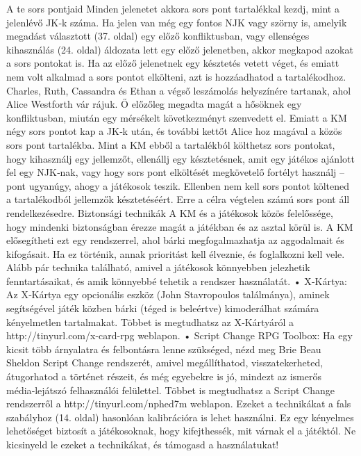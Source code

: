 \documentclass[oneside]{book}
\begin{document}
A te sors pontjaid
Minden jelenetet akkora sors pont tartalékkal kezdj, mint a jelenlévő JK‑k száma. Ha jelen van még egy fontos NJK vagy szörny is, amelyik megadást választott (37. oldal) egy előző konfliktusban, vagy ellenséges kihasználás (24. oldal) áldozata lett egy előző jelenetben, akkor megkapod azokat a sors pontokat is. Ha az előző jelenetnek egy késztetés vetett véget, és emiatt nem volt alkalmad a sors pontot elkölteni, azt is hozzáadhatod a tartalékodhoz.
Charles, Ruth, Cassandra és Ethan a végső leszámolás helyszínére tartanak, ahol Alice Westforth vár rájuk. Ő előzőleg megadta magát a hősöknek egy konfliktusban, miután egy mérsékelt következményt szenvedett el. Emiatt a KM négy sors pontot kap a JK‑k után, és további kettőt Alice hoz magával a közös sors pont tartalékba.
Mint a KM ebből a tartalékból költhetsz sors pontokat, hogy kihasználj egy jellemzőt, ellenállj egy késztetésnek, amit egy játékos ajánlott fel egy NJK‑nak, vagy hogy sors pont elköltését megkövetelő fortélyt használj – pont ugyanúgy, ahogy a játékosok teszik.
Ellenben nem kell sors pontot költened a tartalékodból jellemzők késztetéséért. Erre a célra végtelen számú sors pont áll rendelkezésedre.
Biztonsági technikák
A KM és a játékosok közös felelőssége, hogy mindenki biztonságban érezze magát a játékban és az asztal körül is. A KM elősegítheti ezt egy rendszerrel, ahol bárki megfogalmazhatja az aggodalmait és kifogásait. Ha ez történik, annak prioritást kell élveznie, és foglalkozni kell vele. Alább pár technika található, amivel a játékosok könnyebben jelezhetik fenntartásaikat, és amik könnyebbé tehetik a rendszer használatát.
    • X‑Kártya: Az X‑Kártya egy opcionális eszköz (John Stavropoulos találmánya), aminek segítségével játék közben bárki (téged is beleértve) kimoderálhat számára kényelmetlen tartalmakat. Többet is megtudhatsz az X‑Kártyáról a http://tinyurl.com/x-card-rpg weblapon.
    • Script Change RPG Toolbox: Ha egy kicsit több árnyalatra és felbontásra lenne szükséged, nézd meg Brie Beau Sheldon Script Change rendszerét, amivel megállíthatod, visszatekerheted, átugorhatod a történet részeit, és még egyebekre is jó, mindezt az ismerős média‑lejátszó felhasználói felülettel. Többet is megtudhatsz a Script Change rendszerről a http://tinyurl.com/nphed7m weblapon.
Ezeket a technikákat a fals szabályhoz (14. oldal) hasonlóan kalibrációra is lehet használni. Ez egy kényelmes lehetőséget biztosít a játékosoknak, hogy kifejthessék, mit várnak el a játéktól. Ne kicsinyeld le ezeket a technikákat, és támogasd a használatukat!
\end{document}
